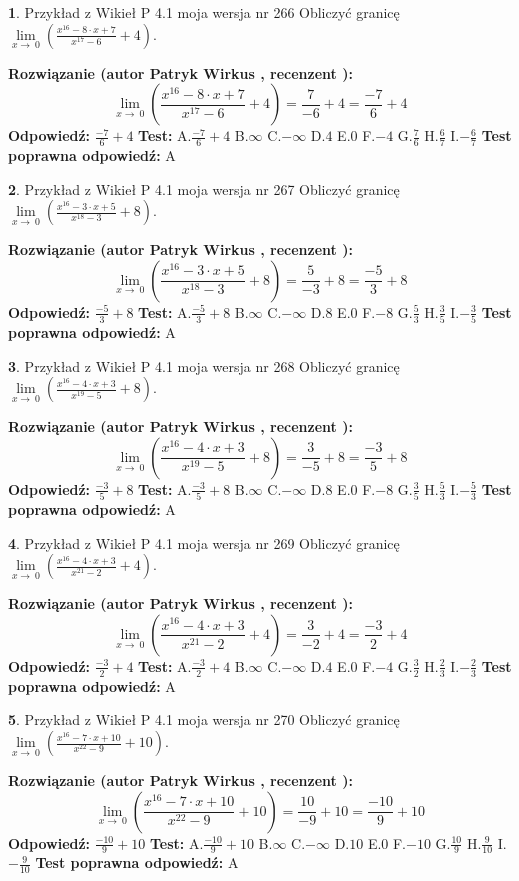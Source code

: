 \documentclass[12pt, a4paper]{article}
\theoremstyle{definition} %
\newtheorem{zad}{}
\newcommand{\zadStart}[1]{\begin{zad}#1\newline}
\newcommand{\zadStop}{\end{zad}}
\newcommand{\rozwStart}[2]{\noindent \textbf{Rozwiązanie (autor #1 , recenzent #2): }\newline}
\newcommand{\rozwStop}{\newline}
\newcommand{\odpStart}{\noindent \textbf{Odpowiedź:}\newline}
\newcommand{\odpStop}{\newline}
\newcommand{\testStart}{\noindent \textbf{Test:}\newline}
\newcommand{\testStop}{\newline}
\newcommand{\kluczStart}{\noindent \textbf{Test poprawna odpowiedź:}\newline}
\newcommand{\kluczStop}{\newline}
\begin{document}
\zadStart{Przykład z Wikieł P 4.1 moja wersja nr 266}
Obliczyć granicę $\lim\limits_{x\to\ 0}(\frac{x^{16}-8 \cdot x +7}{x^{17}-6}+4)$.
\zadStop
\rozwStart{Patryk Wirkus}{}
$$\lim\limits_{x\to\ 0}(\frac{x^{16}-8 \cdot x +7}{x^{17}-6}+4)=\frac{7}{-6}+4=\frac{-7}{6}+4$$
\rozwStop
\odpStart
$\frac{-7}{6}+4$
\odpStop
\testStart
A.$\frac{-7}{6}+4$
B.$\infty$
C.$-\infty$
D.$4$
E.$0$
F.$-4$
G.$\frac{7}{6}$
H.$\frac{6}{7}$
I.$-\frac{6}{7}$
\testStop
\kluczStart
A
\kluczStop



\zadStart{Przykład z Wikieł P 4.1 moja wersja nr 267}
Obliczyć granicę $\lim\limits_{x\to\ 0}(\frac{x^{16}-3 \cdot x +5}{x^{18}-3}+8)$.
\zadStop
\rozwStart{Patryk Wirkus}{}
$$\lim\limits_{x\to\ 0}(\frac{x^{16}-3 \cdot x +5}{x^{18}-3}+8)=\frac{5}{-3}+8=\frac{-5}{3}+8$$
\rozwStop
\odpStart
$\frac{-5}{3}+8$
\odpStop
\testStart
A.$\frac{-5}{3}+8$
B.$\infty$
C.$-\infty$
D.$8$
E.$0$
F.$-8$
G.$\frac{5}{3}$
H.$\frac{3}{5}$
I.$-\frac{3}{5}$
\testStop
\kluczStart
A
\kluczStop



\zadStart{Przykład z Wikieł P 4.1 moja wersja nr 268}
Obliczyć granicę $\lim\limits_{x\to\ 0}(\frac{x^{16}-4 \cdot x +3}{x^{19}-5}+8)$.
\zadStop
\rozwStart{Patryk Wirkus}{}
$$\lim\limits_{x\to\ 0}(\frac{x^{16}-4 \cdot x +3}{x^{19}-5}+8)=\frac{3}{-5}+8=\frac{-3}{5}+8$$
\rozwStop
\odpStart
$\frac{-3}{5}+8$
\odpStop
\testStart
A.$\frac{-3}{5}+8$
B.$\infty$
C.$-\infty$
D.$8$
E.$0$
F.$-8$
G.$\frac{3}{5}$
H.$\frac{5}{3}$
I.$-\frac{5}{3}$
\testStop
\kluczStart
A
\kluczStop



\zadStart{Przykład z Wikieł P 4.1 moja wersja nr 269}
Obliczyć granicę $\lim\limits_{x\to\ 0}(\frac{x^{16}-4 \cdot x +3}{x^{21}-2}+4)$.
\zadStop
\rozwStart{Patryk Wirkus}{}
$$\lim\limits_{x\to\ 0}(\frac{x^{16}-4 \cdot x +3}{x^{21}-2}+4)=\frac{3}{-2}+4=\frac{-3}{2}+4$$
\rozwStop
\odpStart
$\frac{-3}{2}+4$
\odpStop
\testStart
A.$\frac{-3}{2}+4$
B.$\infty$
C.$-\infty$
D.$4$
E.$0$
F.$-4$
G.$\frac{3}{2}$
H.$\frac{2}{3}$
I.$-\frac{2}{3}$
\testStop
\kluczStart
A
\kluczStop



\zadStart{Przykład z Wikieł P 4.1 moja wersja nr 270}
Obliczyć granicę $\lim\limits_{x\to\ 0}(\frac{x^{16}-7 \cdot x +10}{x^{22}-9}+10)$.
\zadStop
\rozwStart{Patryk Wirkus}{}
$$\lim\limits_{x\to\ 0}(\frac{x^{16}-7 \cdot x +10}{x^{22}-9}+10)=\frac{10}{-9}+10=\frac{-10}{9}+10$$
\rozwStop
\odpStart
$\frac{-10}{9}+10$
\odpStop
\testStart
A.$\frac{-10}{9}+10$
B.$\infty$
C.$-\infty$
D.$10$
E.$0$
F.$-10$
G.$\frac{10}{9}$
H.$\frac{9}{10}$
I.$-\frac{9}{10}$
\testStop
\kluczStart
A
\kluczStop
\end{document}
